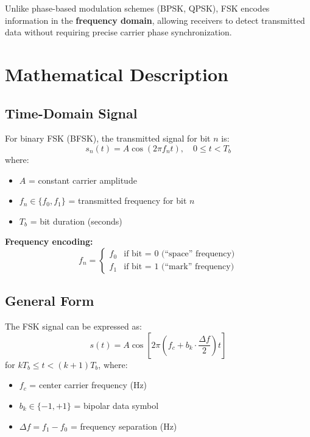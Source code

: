Unlike phase-based modulation schemes (BPSK, QPSK), FSK encodes information in the \textbf{frequency domain}, allowing receivers to detect transmitted data without requiring precise carrier phase synchronization.

\section{Mathematical Description}

\subsection{Time-Domain Signal}

For binary FSK (BFSK), the transmitted signal for bit $n$ is:
\begin{equation}
s_n(t) = A \cos(2\pi f_n t), \quad 0 \leq t < T_b
\end{equation}
where:
\begin{itemize}
\item $A$ = constant carrier amplitude
\item $f_n \in \{f_0, f_1\}$ = transmitted frequency for bit $n$
\item $T_b$ = bit duration (seconds)
\end{itemize}

\textbf{Frequency encoding:}
\begin{equation}
f_n = \begin{cases}
f_0 & \text{if bit = 0 (``space'' frequency)} \\
f_1 & \text{if bit = 1 (``mark'' frequency)}
\end{cases}
\end{equation}

\subsection{General Form}

The FSK signal can be expressed as:
\begin{equation}
s(t) = A \cos\left[2\pi\left(f_c + b_k \cdot \frac{\Delta f}{2}\right)t\right]
\end{equation}
for $kT_b \leq t < (k+1)T_b$, where:
\begin{itemize}
\item $f_c$ = center carrier frequency (Hz)
\item $b_k \in \{-1, +1\}$ = bipolar data symbol
\item $\Delta f = f_1 - f_0$ = frequency separation (Hz)
\end{itemize}

